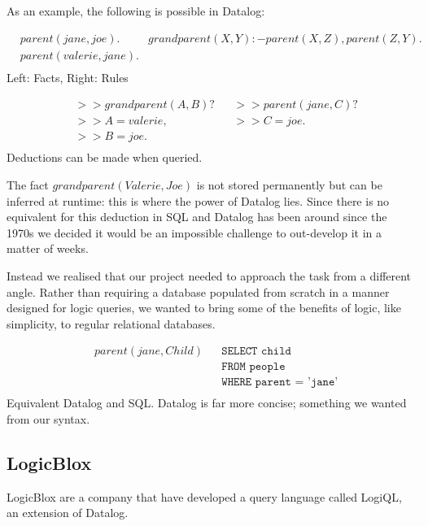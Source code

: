 \documentclass[a4paper, 11pt]{article}
\begin{document}
    As an example, the following is possible in Datalog:
    \begin{center}
      \begin{align*}
        &parent(jane, joe). & grandparent(X, Y) :- parent(X, Z), parent(Z, Y).\\
        &parent(valerie, jane). & \\
      \end{align*}
      Left: Facts, Right: Rules

      \begin{align*}
        &>> grandparent(A, B)?  & & >> parent(jane, C)? \\
        &>> A = valerie,        & & >> C = joe. \\
        &>> B = joe.            & & \\
      \end{align*}
      Deductions can be made when queried.
    \end{center}

    The fact $grandparent(Valerie, Joe)$ is not stored permanently but can be
    inferred at runtime: this is where the power of Datalog lies. Since there is no
    equivalent for this deduction in SQL and Datalog has been around since the 1970s
    we decided it would be an impossible challenge to out-develop it in a matter of
    weeks.

    Instead we realised that our project needed to approach the task from a
    different angle. Rather than requiring a database populated from scratch in a
    manner designed for logic queries, we wanted to bring some of the benefits of
    logic, like simplicity, to regular relational databases.
    \begin{center}
      \begin{align*}
        & parent(jane, Child) & & \texttt{SELECT child} \\
        &                     & & \texttt{FROM people} \\
        &                     & & \texttt{WHERE parent = 'jane'} \\
      \end{align*}
      Equivalent Datalog and SQL. Datalog is far more concise; something we wanted from our syntax.
    \end{center}

  \subsection{LogicBlox}
  LogicBlox are a company that have developed a query language called LogiQL, an extension of Datalog. \cite{logicblox}
\end{document}
